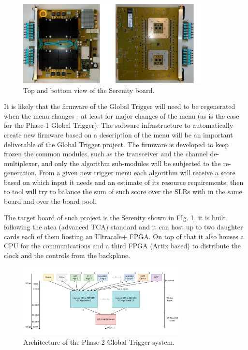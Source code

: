 \documentclass[../../main.tex]{subfiles}
\begin{document}
\begin{figure}[h]
    \centering
    \includegraphics[width=0.87\textwidth]{sections/02/Images/Serenity1v5_combined.png}
    \caption{Top and bottom view of the Serenity board.}
    \label{fig:Phase-2_Serenity}
\end{figure}

It is likely that the firmware of the Global Trigger will need to be regenerated when the menu changes - at least for major changes of the menu (as is the case for the Phase-1 Global Trigger). The software infrastructure to automatically create new firmware based on a description of the menu will be an important deliverable of the Global Trigger project. The firmware is developed to keep frozen the common modules, such as the transceiver and the channel de-multiplexer, and only the algorithm sub-modules will be subjected to the re-generation. From a given new trigger menu each algorithm will receive a score based on which input it needs and an estimate of its resource requirements, then to tool will try to balance the sum of such score over the SLRs with in the same board and over the board pool.  

The target board of such project is the Serenity shown in FIg. \ref{fig:Phase-2_Serenity}, it is built following the \acrshort{atca} (advanced TCA) standard and it can host up to two daughter cards each of them hosting an Ultracale+ FPGA. On top of that it  also houses a CPU for the communications and a third FPGA (Artix based) to distribute the clock and the controls from the backplane. 

\begin{figure}[h]
    \centering
    \includegraphics[width=0.77\textwidth]{sections/02/Images/GT_TDR.pdf}
    \caption{Architecture of the Phase-2 Global Trigger system.}
    \label{fig:GT-TDR}
\end{figure}
\end{document}
